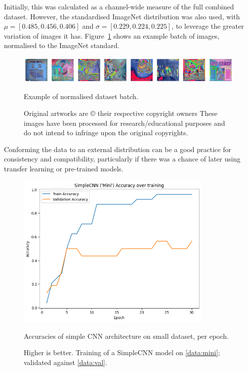                 Initially, this was calculated as a channel-wide measure of the full combined dataset. However, the standardised ImageNet distribution was also used, with \( \mu = [0.485, 0.456, 0.406] \) and \( \sigma = [0.229, 0.224, 0.225] \), to leverage the greater variation of images it has. Figure~\ref{fig:normalisedArts} shows an example batch of images, normalised to the ImageNet standard.
        
                \begin{figure}[h]
                    \centering
                    \includegraphics[width=\textwidth]{images/NormalisedArts.png}
                    \caption{Example of normalised dataset batch.}
                    \label{fig:normalisedArts}
                    \caption*{
                        Original artworks are © their respective copyright owners
                        \footnotesize These images have been processed for research/educational purposes and do not intend to infringe upon the original copyrights.
                    }
                \end{figure}
    
                Conforming the data to an external distribution can be a good practice for consistency and compatibility, particularly if there was a chance of later using transfer learning or pre-trained models.
    
                \begin{figure}[h]
                    \centering
                    \includegraphics[width=0.85\textwidth]{images/SimpleCNN-Mini_Train.png}
                    \caption{Accuracies of simple CNN architecture on small dataset, per epoch.}
                    \label{fig:SimpleCNN-Mini_Train}
                    \caption*{Higher is better. Training of a SimpleCNN model on \ref{data:mini}; validated against \ref{data:val}.}
                \end{figure}
    
